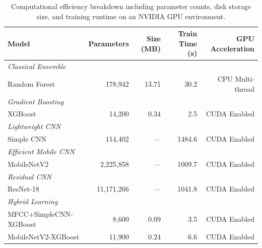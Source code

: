 \begin{table}[ht]
  \centering
  \caption{Computational efficiency breakdown including parameter counts, disk storage size, and training runtime on an NVIDIA GPU environment.}
  \label{tab:efficiency}
  \begin{tabular}{lrrrr}
    \toprule
    \textbf{Model} & \textbf{Parameters} & \textbf{Size (MB)} & \textbf{Train Time (s)} & \textbf{GPU Acceleration} \\
    \midrule
    \multicolumn{5}{l}{\textit{Classical Ensemble}} \\
    Random Forest & 178,942 & 13.71 & 30.2 & CPU Multi-thread \\
    \midrule
    \multicolumn{5}{l}{\textit{Gradient Boosting}} \\
    XGBoost & 14,200 & 0.34 & 2.5 & CUDA Enabled \\
    \midrule
    \multicolumn{5}{l}{\textit{Lightweight CNN}} \\
    Simple CNN & 114,402 & --- & 1484.6 & CUDA Enabled \\
    \midrule
    \multicolumn{5}{l}{\textit{Efficient Mobile CNN}} \\
    MobileNetV2 & 2,225,858 & --- & 1009.7 & CUDA Enabled \\
    \midrule
    \multicolumn{5}{l}{\textit{Residual CNN}} \\
    ResNet-18 & 11,171,266 & --- & 1041.8 & CUDA Enabled \\
    \midrule
    \multicolumn{5}{l}{\textit{Hybrid Learning}} \\
    MFCC+SimpleCNN-XGBoost & 8,600 & 0.09 & 3.5 & CUDA Enabled \\
    MobileNetV2-XGBoost & 11,900 & 0.24 & 6.6 & CUDA Enabled \\
    \bottomrule
  \end{tabular}
\end{table}
